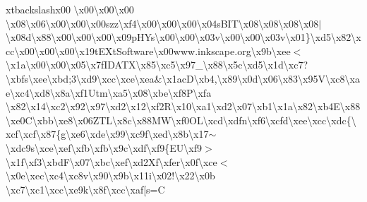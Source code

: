 xtbackslash{}x00 \textbackslash{}x00\textbackslash{}x00\textbackslash{}x00 \textbackslash{}x08\textbackslash{}x06\textbackslash{}x00\textbackslash{}x00\textbackslash{}x00szz\textbackslash{}xf4\textbackslash{}x00\textbackslash{}x00\textbackslash{}x00\textbackslash{}x04s\+B\+I\+T\textbackslash{}x08\textbackslash{}x08\textbackslash{}x08\textbackslash{}x08$\vert$\textbackslash{}x08d\textbackslash{}x88\textbackslash{}x00\textbackslash{}x00\textbackslash{}x00\textbackslash{}x09p\+H\+Ys\textbackslash{}x00\textbackslash{}x00\textbackslash{}x03v\textbackslash{}x00\textbackslash{}x00\textbackslash{}x03v\textbackslash{}x01\}\textbackslash{}xd5\textbackslash{}x82\textbackslash{}xcc\textbackslash{}x00\textbackslash{}x00\textbackslash{}x00\textbackslash{}x19t\+E\+Xt\+Software\textbackslash{}x00www.\+inkscape.\+org\textbackslash{}x9b\textbackslash{}xee$<$\textbackslash{}x1a\textbackslash{}x00\textbackslash{}x00\textbackslash{}x05\textbackslash{}x7f\+I\+D\+A\+T\+X\textbackslash{}x85\textbackslash{}xc5\textbackslash{}x97\+\_\+\textbackslash{}x88\textbackslash{}x5c\textbackslash{}xd5\textbackslash{}x1d\textbackslash{}xc7?\textbackslash{}xbfs\textbackslash{}xee\textbackslash{}xbd;3\textbackslash{}xd9\textbackslash{}xcc\textbackslash{}xce\textbackslash{}xea\&\textbackslash{}x1ac\+D\textbackslash{}xb4,\textbackslash{}x89\textbackslash{}x0d\textbackslash{}x06\textbackslash{}x83\textbackslash{}x95\+V\textbackslash{}xc8\textbackslash{}xae\textbackslash{}xc4\textbackslash{}xd8\textbackslash{}x8a\textbackslash{}xf1\+Utm\textbackslash{}xa5\textbackslash{}x08\textbackslash{}xbe\textbackslash{}xf8\+P\textbackslash{}xfa \textbackslash{}x82\textbackslash{}x14\textbackslash{}xc2\textbackslash{}x92\textbackslash{}x97\textbackslash{}xd2\textbackslash{}x12\textbackslash{}xf2\+R\textbackslash{}x10\textbackslash{}xa1\textbackslash{}xd2\textbackslash{}x07\textbackslash{}xb1\textbackslash{}x1a\textbackslash{}x82\textbackslash{}xb4\+E\textbackslash{}x88\textbackslash{}xe0\+C\textbackslash{}xbb\textbackslash{}xe8\textbackslash{}x06\+Z\+T\+L\textbackslash{}x8c\textbackslash{}x88\+M\+W\textbackslash{}xf0\+O\+L\textbackslash{}xcd\textbackslash{}xdfn\textbackslash{}xf6\textbackslash{}xcfd\textbackslash{}xee\textbackslash{}xcc\textbackslash{}xdc\{\textbackslash{}xcf\textbackslash{}xcf\textbackslash{}x87\{g\textbackslash{}xe6\textbackslash{}xde\textbackslash{}x99\textbackslash{}xc9f\textbackslash{}xed\textbackslash{}x8b\textbackslash{}x17$\sim$\textbackslash{}xdc9s\textbackslash{}xce\textbackslash{}xef\textbackslash{}xfb\textbackslash{}xfb\textbackslash{}x9c\textbackslash{}xdf\textbackslash{}xf9\{\+E\+U\textbackslash{}xf9$>$\textbackslash{}x1f\textbackslash{}xf3\textbackslash{}xbd\+F\textbackslash{}x07\textbackslash{}xbc\textbackslash{}xef\textbackslash{}xd2\+Xf\textbackslash{}xfer\textbackslash{}x0f\textbackslash{}xce$<$\textbackslash{}x0e\textbackslash{}xec\textbackslash{}xc4\textbackslash{}xc8v\textbackslash{}x90\textbackslash{}x9b\textbackslash{}x11i\textbackslash{}x02!\textbackslash{}x22\textbackslash{}x0b \textbackslash{}xc7\textbackslash{}xc1\textbackslash{}xcc\textbackslash{}xe9k\textbackslash{}x8f\textbackslash{}xcc\textbackslash{}xaf\mbox{[}s=\+C 